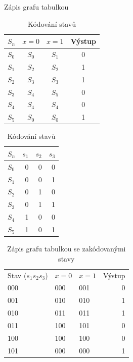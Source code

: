 \begin{table}[!htb]
\begin{minipage}{.5\linewidth}
      \caption{Zápis grafu tabulkou}
      \centering
        \begin{tabular}{l|ccc}
    $S_n$   &  $x=0$  & $x=1$  & \multicolumn{1}{l}{Výstup} \\
    \hline
    $S_0$    & $S_0$    & $S_1$    & 0 \\
    $S_1$    & $S_2$    & $S_2$    & 1 \\
    $S_2$    & $S_3$    & $S_3$    & 1 \\
    $S_3$    & $S_4$    & $S_5$    & 0 \\
    $S_4$    & $S_4$    & $S_4$    & 0 \\
    $S_5$    & $S_0$    & $S_0$    & 1 \\
    \end{tabular}%
    \end{minipage}%
    \begin{minipage}{.5\linewidth}
      \centering
        \caption{Kódování stavů}
         \begin{tabular}{l|rrr}
    $S_n$    & $s_1$ & $s_2$ & $s_3$ \\
        \hline
    $S_0$    & 0     & 0     & 0 \\
    $S_1$   & 0     & 0     & 1 \\
    $S_2$    & 0     & 1     & 0 \\
    $S_3$   & 0     & 1     & 1 \\
    $S_4$   & 1     & 0     & 0 \\
    $S_5$    & 1     & 0     & 1 \\
    \end{tabular}%

    \end{minipage} 

   
  \label{tab:addlabel}%
\end{table}%

\begin{table}[htbp]
  \centering
  \caption{Zápis grafu tabulkou se zakódovanými stavy}
    \begin{tabular}{|l|l|l|r|}
    Stav ($s_1 s_2 s_3$) &$x=0$  & $x=1$ & Výstup \\

    000   & 000   & 001   & 0 \\

    001   & 010   & 010   & 1 \\

    010   & 011   & 011   & 1 \\

    011   & 100   & 101   & 0 \\

    100   & 100   & 100   & 0 \\

    101   & 000   & 000   & 1 \\
    \end{tabular}%
  \label{tab:addlabel}%
\end{table}%

